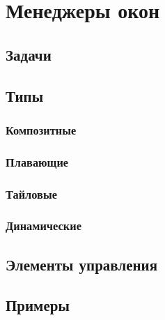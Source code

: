 \section{Менеджеры окон}\label{base:software:wm}
\subsection{Задачи}\label{base:software:wm:tasks}
\subsection{Типы}\label{base:software:wm:types}
\subsubsection{Композитные}\label{base:software:wm:types:composite}
\subsubsection{Плавающие}\label{base:software:wm:types:float}
\subsubsection{Тайловые}\label{base:software:wm:types:tile}
\subsubsection{Динамические}\label{base:software:wm:types:dinamic}
\subsection{Элементы управления}\label{base:software:wm:controls}
\subsection{Примеры}\label{base:software:wm:examples}